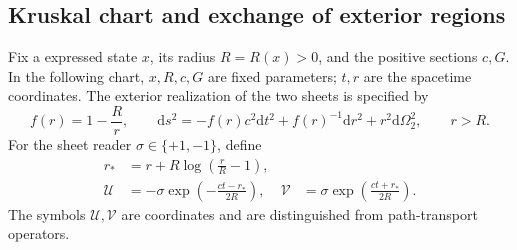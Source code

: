 \subsection{Kruskal chart and exchange of exterior regions}
\label{vii:subsec:kruskal-dos-hojas}

Fix a expressed state \(x\), its radius \(R=R(x)>0\), and the
positive sections \(c,G\). In the following chart, \(x,R,c,G\)
are fixed parameters; \(t,r\) are the spacetime coordinates.
The exterior realization of the two sheets is specified by
\begin{equation}
 f(r)=1-\frac Rr,\qquad
 \mathrm ds^2=-f(r)c^2\mathrm dt^2+f(r)^{-1}\mathrm dr^2
                 +r^2\mathrm d\Omega_2^2,\qquad r>R.
 \label{vii:eq:metrica-exterior}
\end{equation}
For the sheet reader \(\sigma\in\{+1,-1\}\), define
\begin{align}
 r_*&=r+R\log\left(\frac rR-1\right),\\
 \mathcal U&=-\sigma\exp\left(-\frac{ct-r_*}{2R}\right),&
 \mathcal V&=\sigma\exp\left(\frac{ct+r_*}{2R}\right).
 \label{vii:eq:carta-kruskal}
\end{align}
The symbols \(\mathcal U,\mathcal V\) are coordinates and are
distinguished from path-transport operators.

